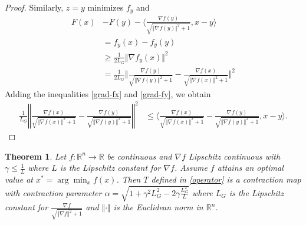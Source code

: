 \documentclass{article}
\newtheorem{theorem}{Theorem}
\begin{document}
\begin{proof}
\noindent
Similarly, $z=y$ minimizes $f_y$  and 
\begin{align}
F(x) &-F(y)-\bigg\langle \frac{\nabla f(y)}{\sqrt{\Vert\nabla f(y)\Vert^2 +1}},x-y \bigg\rangle \nonumber\\
&= f_y(x) - f_y(y) \nonumber\\
&\ge \frac{1}{2L_G} \Vert \nabla f_y(x)\Vert^2 \nonumber\\
&= \frac{1}{2L_G}\bigg\Vert\frac{\nabla f(y)}{\sqrt{\Vert\nabla f(y)\Vert^2 +1}} - \frac{\nabla f(x)}{\sqrt{\Vert\nabla f(x) \Vert^2 +1}} \bigg\Vert^2 \label{grad-fy}
\end{align}
Adding the inequalities \ref{grad-fx} and \ref{grad-fy}, we obtain
\begin{align*}
\frac{1}{L_G}\left\Vert \frac{\nabla f(x)}{\sqrt{\Vert\nabla f(x)\Vert^2 +1}} - \frac{\nabla f(y)}{\sqrt{\Vert\nabla f(y) \Vert^2 +1}} \right\Vert^2 
& \le \bigg \langle \frac{\nabla f(x)}{\sqrt{\Vert\nabla f(x)\Vert^2 +1}}- \frac{\nabla f(y)}{\sqrt{\Vert\nabla f(y)\Vert^2 +1}},x-y \bigg\rangle.
\end{align*}
\end{proof}

\begin{theorem}
Let $f:\mathbb{R}^n \to \mathbb{R}$ be continuous and $\nabla f$ Lipschitz continuous with $\gamma \le \frac{1}{L} $ where $L$ is the Lipschitz constant for $\nabla f$. Assume $f$ attains an optimal value at $x^* = \arg\min_x f(x)$. Then $T$ defined in \eqref{operator} is a contraction map with contraction parameter $\alpha = \sqrt{1 + \gamma^2 L_G^2 - 2\gamma \frac{L_G^2}{L}}$ where $L_G$ is the Lipschitz constant for 
$\displaystyle \frac{\nabla f}{\sqrt{\Vert \nabla f \Vert^2 + 1}} $ and $\Vert \cdot \Vert$ is the Euclidean norm in $\mathbb{R}^n$.
\end{theorem}
\end{document}
